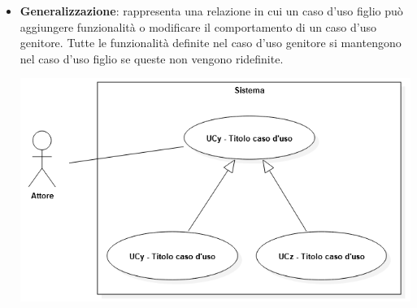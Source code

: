 \begin{itemize}
\begin{itemize}
\begin{center}
				\end{center} 
		\newpage
		    \item \textbf{Generalizzazione}: rappresenta una relazione in cui un caso d'uso figlio può aggiungere funzionalità o modificare il comportamento di un caso d'uso genitore. Tutte le funzionalità definite nel caso d'uso genitore si mantengono nel caso d'uso figlio se queste non vengono ridefinite.
				\begin{center}
					\includegraphics*[width=15cm]{../../../images/norme_di_progetto/generalizzazioneCasiDiUso.png}
				\end{center}
	    \end{itemize}

	
\end{itemize}

